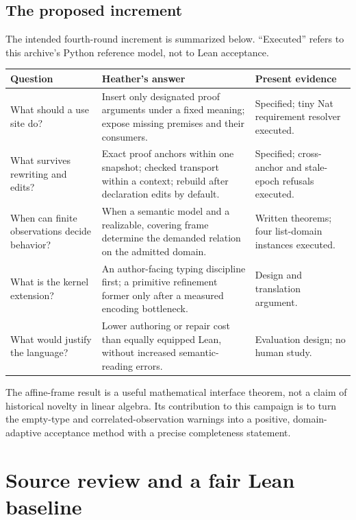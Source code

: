 \documentclass[11pt,letterpaper]{article}
\theoremstyle{definition}\newtheorem{definition}[theorem]{Definition}
\theoremstyle{remark}\newtheorem{remark}[theorem]{Remark}
\begin{document}
\subsection{The proposed increment}
The intended fourth-round increment is summarized below. ``Executed'' refers
to this archive's Python reference model, not to Lean acceptance.

\begin{center}\small
\begin{tabularx}{\textwidth}{@{}P{0.23\textwidth}Y P{0.20\textwidth}@{}}
\toprule Question & Heather's answer & Present evidence\\\midrule
What should a use site do? & Insert only designated proof arguments under a fixed
meaning; expose missing premises and their consumers. & Specified; tiny Nat
requirement resolver executed.\\
What survives rewriting and edits? & Exact proof anchors within one snapshot;
checked transport within a context; rebuild after declaration edits by default.
& Specified; cross-anchor and stale-epoch refusals executed.\\
When can finite observations decide behavior? & When a semantic model and a
realizable, covering frame determine the demanded relation on the admitted domain.
& Written theorems; four list-domain instances executed.\\
What is the kernel extension? & An author-facing typing discipline first;
a primitive refinement former only after a measured encoding bottleneck.
& Design and translation argument.\\
What would justify the language? & Lower authoring or repair cost than equally
equipped Lean, without increased semantic-reading errors. & Evaluation design;
no human study.\\
\bottomrule
\end{tabularx}
\end{center}

The affine-frame result is a useful mathematical interface theorem, not a claim
of historical novelty in linear algebra. Its contribution to this campaign is
to turn the empty-type and correlated-observation warnings into a positive,
domain-adaptive acceptance method with a precise completeness statement.

\section{Source review and a fair Lean baseline}\label{sec:sources}
\end{document}
